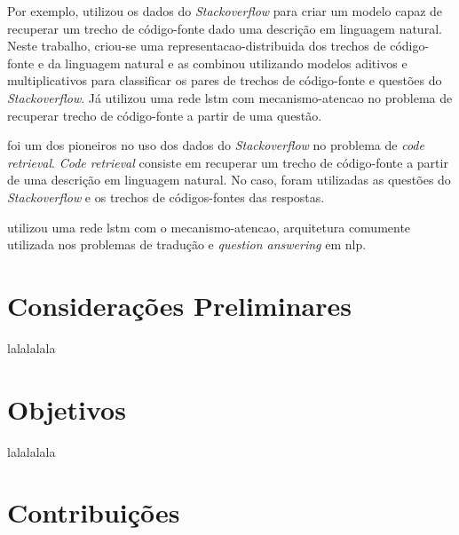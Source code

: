 Por exemplo, \cite{Allamanis-bimodal-source-code-natural-language:2015} utilizou os dados do \textit{Stackoverflow} para criar um \gls{modelo} capaz de recuperar um trecho de código-fonte dado uma descrição em linguagem natural. Neste trabalho, criou-se uma \gls{representacao-distribuida} dos trechos de código-fonte e da linguagem natural e as combinou utilizando modelos aditivos e multiplicativos para classificar os pares de trechos de código-fonte e questões do \textit{Stackoverflow}. Já \cite{iyer-etal-2016-summarizing} utilizou uma rede \acrfull{lstm} com \gls{mecanismo-atencao} no problema de recuperar trecho de código-fonte a partir de uma questão.

\cite{Allamanis-bimodal-source-code-natural-language:2015} foi um dos pioneiros no uso dos dados do \textit{Stackoverflow} no problema de \textit{code retrieval}. \textit{Code retrieval} consiste em recuperar um trecho de código-fonte a partir de uma descrição em linguagem natural. No caso, foram utilizadas as questões do \textit{Stackoverflow} e os trechos de códigos-fontes das respostas. 

\cite{iyer-etal-2016-summarizing} utilizou uma rede \acrshort{lstm} com o \gls{mecanismo-atencao}, arquitetura comumente utilizada nos problemas de tradução e \textit{question answering} em \acrfull{nlp}. 








\section{Considerações Preliminares}
\label{sec:consideracoes_preliminares}

lalalalala


\section{Objetivos}
\label{sec:objetivo}

lalalalala

\section{Contribuições}
\label{sec:contribucoes}

